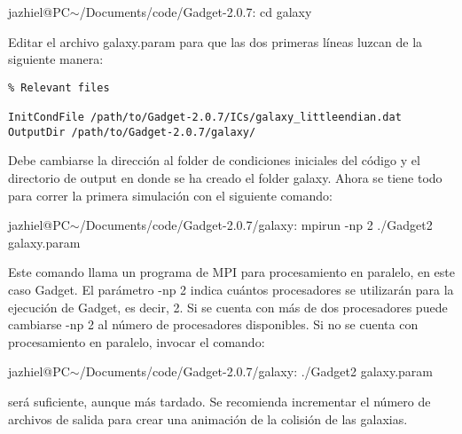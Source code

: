 \documentclass[a4paper,openright,12pt]{book}
\begin{document}
\begin{enumerate}
\textsf{jazhiel@PC$\sim$/Documents/code/Gadget-2.0.7: cd galaxy}

Editar el archivo \textsf{galaxy.param} para que las dos primeras líneas luzcan de la siguiente manera:

\begin{verbatim}
% Relevant files

InitCondFile /path/to/Gadget-2.0.7/ICs/galaxy_littleendian.dat
OutputDir /path/to/Gadget-2.0.7/galaxy/
\end{verbatim}

Debe cambiarse la dirección al folder de condiciones iniciales del código y el directorio de \textsf{output} en donde se ha creado el folder \textsf{galaxy}. Ahora se tiene todo para correr la primera simulación con el siguiente comando:

\textsf{jazhiel@PC$\sim$/Documents/code/Gadget-2.0.7/galaxy: mpirun -np 2 ./Gadget2 galaxy.param}

Este comando llama un programa de MPI para procesamiento en paralelo, en este caso Gadget. El parámetro \textsf{-np 2} indica cuántos procesadores se utilizarán para la ejecución de Gadget, es decir, 2. Si se cuenta con más de dos procesadores puede cambiarse \textsf{-np 2} al número de procesadores disponibles. Si no se cuenta con procesamiento en paralelo, invocar el comando:

\textsf{jazhiel@PC$\sim$/Documents/code/Gadget-2.0.7/galaxy: ./Gadget2 galaxy.param}

será suficiente, aunque más tardado. Se recomienda incrementar el número de archivos de salida para crear una animación de la colisión de las galaxias.
\end{enumerate}
\end{document}
